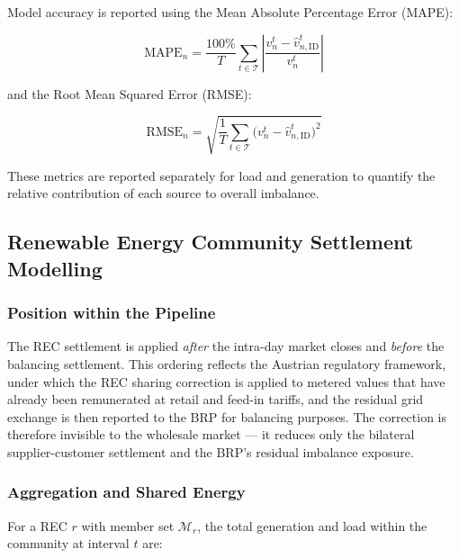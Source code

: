 \documentclass[12pt,a4paper]{article}
\begin{document}
Model accuracy is reported using the Mean Absolute Percentage Error (MAPE):

\begin{equation}
\mathrm{MAPE}_{n}
  = \frac{100\%}{T}
    \sum_{t \in \mathcal{T}}
    \left|
      \frac{v_{n}^{t} - \hat{v}_{n,\mathrm{ID}}^{t}}{v_{n}^{t}}
    \right|
\label{eq:mape_infra}
\end{equation}

and the Root Mean Squared Error (RMSE):

\begin{equation}
\mathrm{RMSE}_{n}
  = \sqrt{\frac{1}{T} \sum_{t \in \mathcal{T}}
    \bigl(v_{n}^{t} - \hat{v}_{n,\mathrm{ID}}^{t}\bigr)^{2}}
\label{eq:rmse}
\end{equation}

These metrics are reported separately for load and generation to quantify the
relative contribution of each source to overall imbalance.

\subsection{Renewable Energy Community Settlement Modelling}
\label{subsec:rec_model}

\subsubsection{Position within the Pipeline}

The REC settlement is applied \emph{after} the intra-day market closes and
\emph{before} the balancing settlement.  This ordering reflects the Austrian
regulatory framework, under which the REC sharing correction is applied to
metered values that have already been remunerated at retail and feed-in
tariffs, and the residual grid exchange is then reported to the BRP for
balancing purposes.  The correction is therefore invisible to the wholesale
market — it reduces only the bilateral supplier-customer settlement and the
BRP's residual imbalance exposure.

\subsubsection{Aggregation and Shared Energy}

For a REC $r$ with member set $\mathcal{M}_{r}$, the total generation and
load within the community at interval $t$ are:
\end{document}
